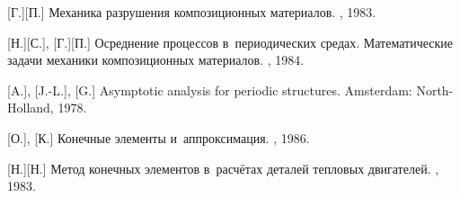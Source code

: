 \begin{thebibliography}{123}
\begin{otherlanguage}{russian}
[Г.][П.] Механика разрушения композиционных материалов. \naukapublisher, 1983. 

[Н.][С.], [Г.][П.] Осреднение процессов в~периодических средах. Математические задачи механики композиционных материалов. \naukapublisher, 1984. 

[A.], %
[J.-L.], %
[G.]
Asymptotic analysis for periodic structures. Amsterdam: North\hbox{-}Holland, 1978. 

%
%



[О.], [К.] Конечные элементы и~аппроксимация. \mirpublisher, 1986. 

[Н.][Н.] Метод конечных элементов в~расчётах деталей тепловых двигателей. \maschinenbauleningraderverlag, 1983. 

%
%





\end{otherlanguage}
\end{thebibliography}
